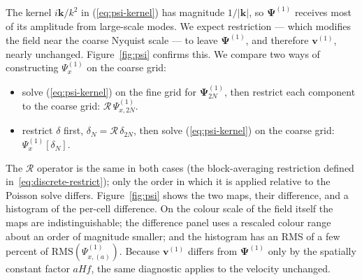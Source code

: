 \documentclass[12pt]{article}
\newcommand{\R}{\mathcal{R}}
\begin{document}
The kernel $i\mathbf k/k^2$ in (\ref{eq:psi-kernel}) has magnitude
$1/|\mathbf k|$, so $\boldsymbol{\Psi}^{(1)}$ receives most of its
amplitude from large-scale modes. We expect restriction --- which
modifies the field near the coarse Nyquist scale --- to leave
$\boldsymbol{\Psi}^{(1)}$, and therefore $\mathbf v^{(1)}$, nearly
unchanged. Figure~\ref{fig:psi} confirms this. We compare two ways of constructing $\Psi_x^{(1)}$ on
the coarse grid:
\begin{itemize}
\item[(a)] solve (\ref{eq:psi-kernel}) on the fine grid for
      $\boldsymbol\Psi^{(1)}_{2N}$, then restrict each component to
      the coarse grid: $\R\,\Psi^{(1)}_{x,2N}$.
\item[(b)] restrict $\delta$ first, $\delta_N = \R\,\delta_{2N}$, then
      solve (\ref{eq:psi-kernel}) on the coarse grid:
      $\Psi^{(1)}_x[\delta_N]$.
\end{itemize}
The $\R$ operator is the same in both cases (the block-averaging
restriction defined in~\eqref{eq:discrete-restrict}); only the order
in which it is applied relative to the Poisson solve differs.
Figure~\ref{fig:psi} shows the two maps, their difference, and a
histogram of the per-cell difference. On the colour scale of the field
itself the maps are indistinguishable; the difference panel uses a
rescaled colour range about an order of magnitude smaller; and the
histogram has an RMS of a few percent of
$\mathrm{RMS}(\Psi^{(1)}_{x,(a)})$. Because $\mathbf v^{(1)}$ differs
from $\boldsymbol{\Psi}^{(1)}$ only by the spatially constant factor
$aHf$, the same diagnostic applies to the velocity unchanged.
\end{document}
